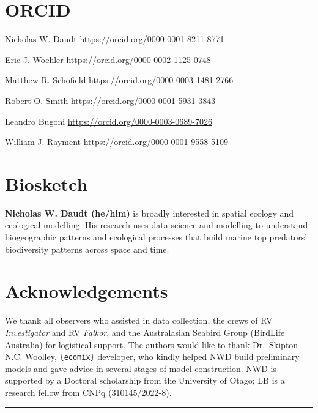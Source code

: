 \documentclass{article}
\begin{document}
\hypertarget{orcid}{%
\section*{ORCID}\label{orcid}}

Nicholas W. Daudt \url{https://orcid.org/0000-0001-8211-8771}

Eric J. Woehler \url{https://orcid.org/0000-0002-1125-0748}

Matthew R. Schofield \url{https://orcid.org/0000-0003-1481-2766}

Robert O. Smith \url{https://orcid.org/0000-0001-5931-3843}

Leandro Bugoni \url{https://orcid.org/0000-0003-0689-7026}

William J. Rayment \url{https://orcid.org/0000-0001-9558-5109}

\hypertarget{biosketch}{%
\section*{Biosketch}\label{biosketch}}

\textbf{Nicholas W. Daudt (he/him)} is broadly interested in spatial ecology and ecological modelling. His research uses data science and modelling to understand biogeographic patterns and ecological processes that build marine top predators' biodiversity patterns across space and time.

\hypertarget{acknowledgements}{%
\section*{Acknowledgements}\label{acknowledgements}}

We thank all observers who assisted in data collection, the crews of RV \emph{Investigator} and RV \emph{Falkor}, and the Australasian Seabird Group (BirdLife Australia) for logistical support. The authors would like to thank Dr.~Skipton N.C. Woolley, \texttt{\{ecomix\}} developer, who kindly helped NWD build preliminary models and gave advice in several stages of model construction. NWD is supported by a Doctoral scholarship from the University of Otago; LB is a research fellow from CNPq (310145/2022-8).

\begin{center}\rule{0.5\linewidth}{0.5pt}\end{center}
\end{document}
